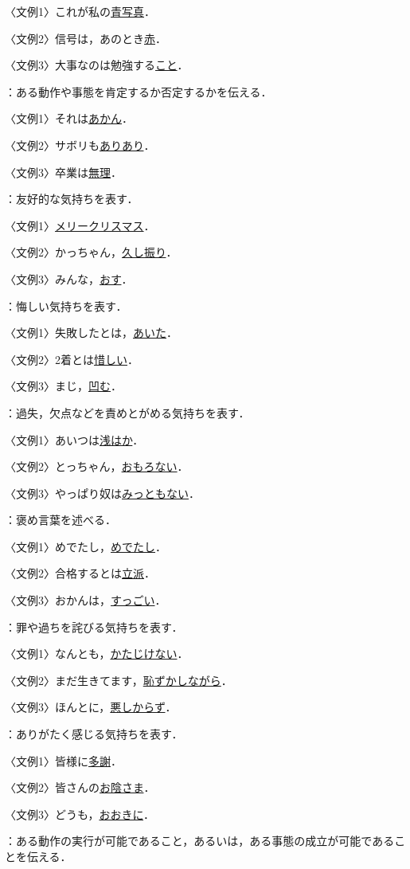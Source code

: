 \documentclass[japanese]{jnlp_1.4}
\newcommand{\InHone}[1]{}
\begin{document}
〈文例1〉これが私の\ul{青写真}．

〈文例2〉信号は，あのとき\ul{赤}．

〈文例3〉大事なのは勉強する\ul{こと}．

\InHone{(2)}
：ある動作や事態を肯定するか否定するかを伝える．

〈文例1〉それは\ul{あかん}．

〈文例2〉サボリも\ul{ありあり}．

〈文例3〉卒業は\ul{無理}．

\InHone{(3)}
：友好的な気持ちを表す．

〈文例1〉\ul{メリークリスマス}．

〈文例2〉かっちゃん，\ul{久し振り}．

〈文例3〉みんな，\ul{おす}．

\InHone{(4)}
：悔しい気持ちを表す．

〈文例1〉失敗したとは，\ul{あいた}．

〈文例2〉2着とは\ul{惜しい}．

〈文例3〉まじ，\ul{凹む}．

\InHone{(5)}
：過失，欠点などを責めとがめる気持ちを表す．

〈文例1〉あいつは\ul{浅はか}．

〈文例2〉とっちゃん，\ul{おもろない}．

〈文例3〉やっぱり奴は\ul{みっともない}．

\InHone{(6)}
：褒め言葉を述べる．

〈文例1〉めでたし，\ul{めでたし}．

〈文例2〉合格するとは\ul{立派}．

〈文例3〉おかんは，\ul{すっごい}．

\InHone{(7)}
：罪や過ちを詫びる気持ちを表す．

〈文例1〉なんとも，\ul{かたじけない}．

〈文例2〉まだ生きてます，\ul{恥ずかしながら}．

〈文例3〉ほんとに，\ul{悪しからず}．

\InHone{(8)}
：ありがたく感じる気持ちを表す．

〈文例1〉皆様に\ul{多謝}．

〈文例2〉皆さんの\ul{お陰さま}．

〈文例3〉どうも，\ul{おおきに}．

\InHone{(9)}
：ある動作の実行が可能であること，あるいは，ある事態の成立が可能であることを伝える．
\end{document}
